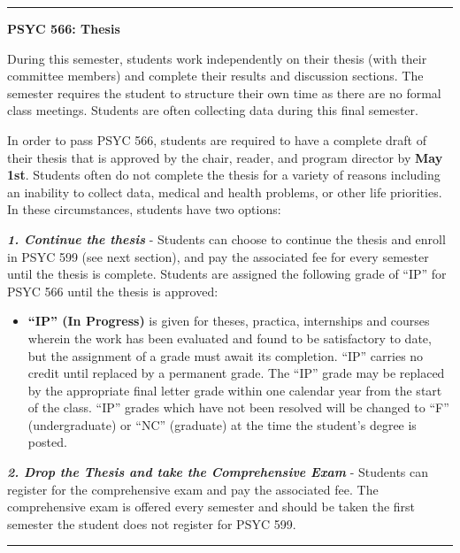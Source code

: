 \documentclass[
  openany]{book}
\providecommand{\tightlist}{%
  \setlength{\itemsep}{0pt}\setlength{\parskip}{0pt}}
\begin{document}
\begin{center}\rule{0.5\linewidth}{0.5pt}\end{center}

\textbf{PSYC 566: Thesis}

During this semester, students work independently on their thesis (with their committee members) and complete their results and discussion sections. The semester requires the student to structure their own time as there are no formal class meetings. Students are often collecting data during this final semester.

In order to pass PSYC 566, students are required to have a complete draft of their thesis that is approved by the chair, reader, and program director by \textbf{May 1st}. Students often do not complete the thesis for a variety of reasons including an inability to collect data, medical and health problems, or other life priorities. In these circumstances, students have two options:

\textbf{\emph{1. Continue the thesis}} - Students can choose to continue the thesis and enroll in PSYC 599 (see next section), and pay the associated fee for every semester until the thesis is complete. Students are assigned the following grade of ``IP'' for PSYC 566 until the thesis is approved:

\begin{itemize}
\tightlist
\item
  \textbf{``IP'' (In Progress)} is given for theses, practica, internships and courses wherein the work has been evaluated and found to be satisfactory to date, but the assignment of a grade must await its completion. ``IP'' carries no credit until replaced by a permanent grade. The ``IP'' grade may be replaced by the appropriate final letter grade within one calendar year from the start of the class. ``IP'' grades which have not been resolved will be changed to ``F'' (undergraduate) or ``NC'' (graduate) at the time the student's degree is posted.
\end{itemize}

\textbf{\emph{2. Drop the Thesis and take the Comprehensive Exam}} - Students can register for the comprehensive exam and pay the associated fee. The comprehensive exam is offered every semester and should be taken the first semester the student does not register for PSYC 599.

\begin{center}\rule{0.5\linewidth}{0.5pt}\end{center}
\end{document}
